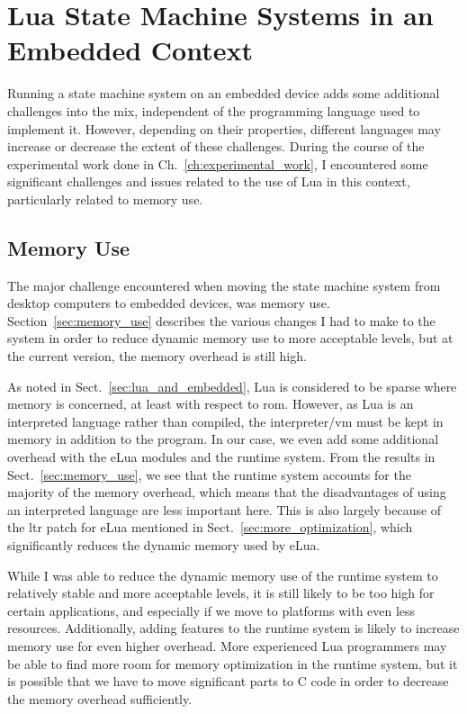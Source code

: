 \section{Lua State Machine Systems in an Embedded Context}
\label{sec:disq_lua_embedded}
Running a state machine system on an embedded device adds some additional challenges into the mix, independent of the programming language used to implement it. However, depending on their properties, different languages may increase or decrease the extent of these challenges. During the course of the experimental work done in Ch.~\ref{ch:experimental_work}, I encountered some significant challenges and issues related to the use of Lua in this context, particularly related to memory use.

\subsection{Memory Use}
\label{sec:disq_memory_use}
The major challenge encountered when moving the state machine system from desktop computers to embedded devices, was memory use. Section~\ref{sec:memory_use} describes the various changes I had to make to the system in order to reduce dynamic memory use to more acceptable levels, but at the current version, the memory overhead is still high.

\noindent
As noted in Sect.~\ref{sec:lua_and_embedded}, Lua is considered to be sparse where memory is concerned, at least with respect to \gls{rom}. However, as Lua is an interpreted language rather than compiled, the interpreter/\gls{vm} must be kept in memory in addition to the program. In our case, we even add some additional overhead with the eLua modules and the runtime system. From the results in Sect.~\ref{sec:memory_use}, we see that the runtime system accounts for the majority of the memory overhead, which means that the disadvantages of using an interpreted language are less important here. This is also largely because of the \gls{ltr} patch for eLua mentioned in Sect.~\ref{sec:more_optimization}, which significantly reduces the dynamic memory used by eLua.

\noindent
While I was able to reduce the dynamic memory use of the runtime system to relatively stable and more acceptable levels, it is still likely to be too high for certain applications, and especially if we move to platforms with even less resources. Additionally, adding features to the runtime system is likely to increase memory use for even higher overhead. More experienced Lua programmers may be able to find more room for memory optimization in the runtime system, but it is possible that we have to move significant parts to C code in order to decrease the memory overhead sufficiently.

